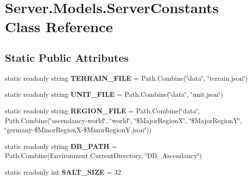 \hypertarget{classServer_1_1Models_1_1ServerConstants}{\section{Server.\-Models.\-Server\-Constants Class Reference}
\label{classServer_1_1Models_1_1ServerConstants}
}
\subsection*{Static Public Attributes}
\begin{DoxyCompactItemize}
\item 
\hypertarget{classServer_1_1Models_1_1ServerConstants_a7f75857909d69ae4f0383bd056bb7ece}{static readonly string {\bfseries T\-E\-R\-R\-A\-I\-N\-\_\-\-F\-I\-L\-E} = Path.\-Combine(\char`\"{}data\char`\"{}, \char`\"{}terrain.\-json\char`\"{})}\label{classServer_1_1Models_1_1ServerConstants_a7f75857909d69ae4f0383bd056bb7ece}

\item 
\hypertarget{classServer_1_1Models_1_1ServerConstants_ab3ffa60d4d7a6a7ca066f99e815b9471}{static readonly string {\bfseries U\-N\-I\-T\-\_\-\-F\-I\-L\-E} = Path.\-Combine(\char`\"{}data\char`\"{}, \char`\"{}unit.\-json\char`\"{})}\label{classServer_1_1Models_1_1ServerConstants_ab3ffa60d4d7a6a7ca066f99e815b9471}

\item 
\hypertarget{classServer_1_1Models_1_1ServerConstants_a5d1875e241daeed9ec89b7ab3c49d3ec}{static readonly string {\bfseries R\-E\-G\-I\-O\-N\-\_\-\-F\-I\-L\-E} = Path.\-Combine(\char`\"{}data\char`\"{}, Path.\-Combine(\char`\"{}ascendancy-\/world\char`\"{}, \char`\"{}world\char`\"{}, \char`\"{}\$Major\-Region\-X\char`\"{}, \char`\"{}\$Major\-Region\-Y\char`\"{}, \char`\"{}germany-\/\$Minor\-Region\-X-\/\$Minor\-Region\-Y.\-json\char`\"{}))}\label{classServer_1_1Models_1_1ServerConstants_a5d1875e241daeed9ec89b7ab3c49d3ec}

\item 
\hypertarget{classServer_1_1Models_1_1ServerConstants_aed13f8301da1cc1f8e0bc6c7a8936807}{static readonly string {\bfseries D\-B\-\_\-\-P\-A\-T\-H} = Path.\-Combine(Environment.\-Current\-Directory, \char`\"{}D\-B\-\_\-\-Ascendancy\char`\"{})}\label{classServer_1_1Models_1_1ServerConstants_aed13f8301da1cc1f8e0bc6c7a8936807}

\item 
\hypertarget{classServer_1_1Models_1_1ServerConstants_a2627c643caf77b36fed32b74811438f2}{static readonly int {\bfseries S\-A\-L\-T\-\_\-\-S\-I\-Z\-E} = 32}\label{classServer_1_1Models_1_1ServerConstants_a2627c643caf77b36fed32b74811438f2}


\end{DoxyCompactItemize}
